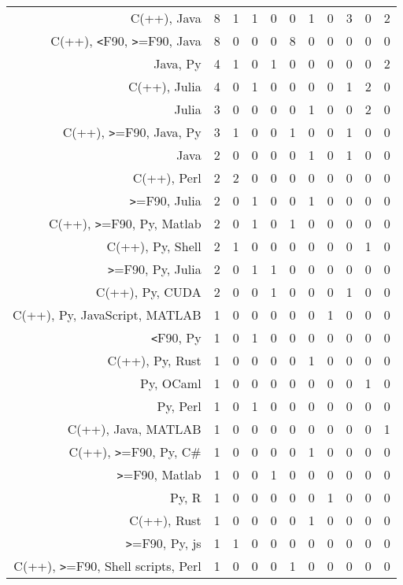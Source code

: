 {\begin{landscape}
\begin{longtable}[htb]{r|c|c|c|c|c|c|c|c|c|c}
{C(++), Java} & 8 & 1 & 1 & 0 & 0 & 1 & 0 & 3 & 0 & 2 \\%
{C(++), \verb!<!F90, \verb!>!=F90, Java} & 8 & 0 & 0 & 0 & 8 & 0 & 0 & 0 & 0 & 0 \\%
{Java, Py} & 4 & 1 & 0 & 1 & 0 & 0 & 0 & 0 & 0 & 2 \\%
{C(++), Julia} & 4 & 0 & 1 & 0 & 0 & 0 & 0 & 1 & 2 & 0 \\%
{Julia} & 3 & 0 & 0 & 0 & 0 & 1 & 0 & 0 & 2 & 0 \\%
{C(++), \verb!>!=F90, Java, Py} & 3 & 1 & 0 & 0 & 1 & 0 & 0 & 1 & 0 & 0 \\%
{Java} & 2 & 0 & 0 & 0 & 0 & 1 & 0 & 1 & 0 & 0 \\%
{C(++), Perl} & 2 & 2 & 0 & 0 & 0 & 0 & 0 & 0 & 0 & 0 \\%
{\verb!>!=F90, Julia} & 2 & 0 & 1 & 0 & 0 & 1 & 0 & 0 & 0 & 0 \\%
{C(++), \verb!>!=F90, Py, Matlab} & 2 & 0 & 1 & 0 & 1 & 0 & 0 & 0 & 0 & 0 \\%
{C(++), Py, Shell} & 2 & 1 & 0 & 0 & 0 & 0 & 0 & 0 & 1 & 0 \\%
{\verb!>!=F90, Py, Julia} & 2 & 0 & 1 & 1 & 0 & 0 & 0 & 0 & 0 & 0 \\%
{C(++), Py, CUDA} & 2 & 0 & 0 & 1 & 0 & 0 & 0 & 1 & 0 & 0 \\%
{C(++), Py, JavaScript, MATLAB} & 1 & 0 & 0 & 0 & 0 & 0 & 1 & 0 & 0 & 0 \\%
{\verb!<!F90, Py} & 1 & 0 & 1 & 0 & 0 & 0 & 0 & 0 & 0 & 0 \\%
{C(++), Py, Rust} & 1 & 0 & 0 & 0 & 0 & 1 & 0 & 0 & 0 & 0 \\%
{Py, OCaml} & 1 & 0 & 0 & 0 & 0 & 0 & 0 & 0 & 1 & 0 \\%
{Py, Perl} & 1 & 0 & 1 & 0 & 0 & 0 & 0 & 0 & 0 & 0 \\%
{C(++), Java, MATLAB} & 1 & 0 & 0 & 0 & 0 & 0 & 0 & 0 & 0 & 1 \\%
{C(++), \verb!>!=F90, Py, C\#} & 1 & 0 & 0 & 0 & 0 & 1 & 0 & 0 & 0 & 0 \\%
{\verb!>!=F90, Matlab} & 1 & 0 & 0 & 1 & 0 & 0 & 0 & 0 & 0 & 0 \\%
{Py, R} & 1 & 0 & 0 & 0 & 0 & 0 & 1 & 0 & 0 & 0 \\%
{C(++), Rust} & 1 & 0 & 0 & 0 & 0 & 1 & 0 & 0 & 0 & 0 \\%
{\verb!>!=F90, Py, js} & 1 & 1 & 0 & 0 & 0 & 0 & 0 & 0 & 0 & 0 \\%
{C(++), \verb!>!=F90, Shell scripts, Perl} & 1 & 0 & 0 & 0 & 1 & 0 & 0 & 0 & 0 & 0 \\%

\end{longtable}
\end{landscape}}
